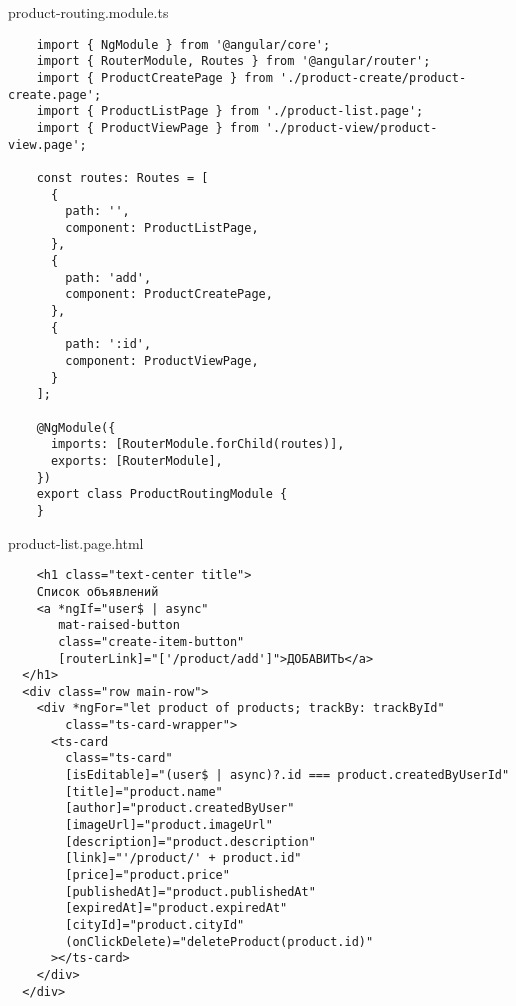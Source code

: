 product-routing.module.ts
\begin{lstlisting}
    import { NgModule } from '@angular/core';
    import { RouterModule, Routes } from '@angular/router';
    import { ProductCreatePage } from './product-create/product-create.page';
    import { ProductListPage } from './product-list.page';
    import { ProductViewPage } from './product-view/product-view.page';
    
    const routes: Routes = [
      {
        path: '',
        component: ProductListPage,
      },
      {
        path: 'add',
        component: ProductCreatePage,
      },
      {
        path: ':id',
        component: ProductViewPage,
      }
    ];
    
    @NgModule({
      imports: [RouterModule.forChild(routes)],
      exports: [RouterModule],
    })
    export class ProductRoutingModule {
    }    
\end{lstlisting}

product-list.page.html
\begin{lstlisting}
    <h1 class="text-center title">
    Список объявлений
    <a *ngIf="user$ | async"
       mat-raised-button
       class="create-item-button"
       [routerLink]="['/product/add']">ДОБАВИТЬ</a>
  </h1>
  <div class="row main-row">
    <div *ngFor="let product of products; trackBy: trackById"
        class="ts-card-wrapper">
      <ts-card
        class="ts-card"
        [isEditable]="(user$ | async)?.id === product.createdByUserId"
        [title]="product.name"
        [author]="product.createdByUser"
        [imageUrl]="product.imageUrl"
        [description]="product.description"
        [link]="'/product/' + product.id"
        [price]="product.price"
        [publishedAt]="product.publishedAt"
        [expiredAt]="product.expiredAt"
        [cityId]="product.cityId"
        (onClickDelete)="deleteProduct(product.id)"
      ></ts-card>
    </div>
  </div>
\end{lstlisting}


